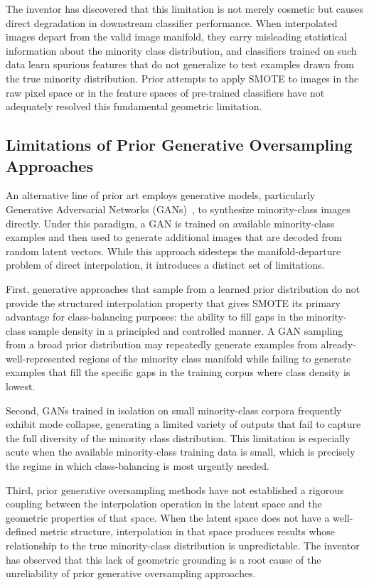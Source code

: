 \documentclass[12pt,letterpaper]{article}
\begin{document}
The inventor has discovered that this limitation is not merely cosmetic but
causes direct degradation in downstream classifier performance. When
interpolated images depart from the valid image manifold, they carry misleading
statistical information about the minority class distribution, and classifiers
trained on such data learn spurious features that do not generalize to test
examples drawn from the true minority distribution. Prior attempts to apply
SMOTE to images in the raw pixel space or in the feature spaces of pre-trained
classifiers have not adequately resolved this fundamental geometric limitation.

\subsection{Limitations of Prior Generative Oversampling Approaches}

An alternative line of prior art employs generative models, particularly
Generative Adversarial Networks (GANs)~\cite{goodfellow2014}, to synthesize
minority-class images directly. Under this paradigm, a GAN is trained on
available minority-class examples and then used to generate additional images
that are decoded from random latent vectors. While this approach sidesteps the
manifold-departure problem of direct interpolation, it introduces a distinct
set of limitations.

First, generative approaches that sample from a learned prior distribution do
not provide the structured interpolation property that gives SMOTE its primary
advantage for class-balancing purposes: the ability to fill gaps in the
minority-class sample density in a principled and controlled manner. A GAN
sampling from a broad prior distribution may repeatedly generate examples from
already-well-represented regions of the minority class manifold while failing
to generate examples that fill the specific gaps in the training corpus where
class density is lowest.

Second, GANs trained in isolation on small minority-class corpora frequently
exhibit mode collapse, generating a limited variety of outputs that fail to
capture the full diversity of the minority class distribution. This limitation
is especially acute when the available minority-class training data is small,
which is precisely the regime in which class-balancing is most urgently needed.

Third, prior generative oversampling methods have not established a rigorous
coupling between the interpolation operation in the latent space and the
geometric properties of that space. When the latent space does not have a
well-defined metric structure, interpolation in that space produces results
whose relationship to the true minority-class distribution is unpredictable.
The inventor has observed that this lack of geometric grounding is a root cause
of the unreliability of prior generative oversampling approaches.
\end{document}
